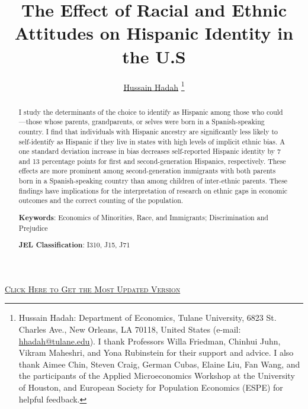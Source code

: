 \documentclass[12pt,english]{article}
\begin{document}
\title{The Effect of Racial and Ethnic Attitudes on Hispanic Identity in the U.S}

\author{\href{https://hussainhadah.com/}{Hussain Hadah} \thanks{Hussain Hadah: Department of Economics, Tulane University, 6823 St. Charles Ave., New Orleans, LA 70118, United States (e-mail: \href{mailto:hhadah@tulane.edu}{hhadah@tulane.edu}). I thank Professors Willa Friedman, Chinhui Juhn, Vikram Maheshri, and Yona Rubinstein for their support and advice. I also thank Aimee Chin, Steven Craig, German Cubas, Elaine Liu, Fan Wang, and the participants of the Applied Microeconomics Workshop at the University of Houston, and European Society for Population Economics (ESPE) for helpful feedback.}}


\maketitle

\begin{center}
\href{https://hhadah.github.io/Attitudes-and-Identity/my_paper/Hadah-Attitudes.pdf}{\textcolor{green!15!black!30!blue}{\footnotesize{\textsc{Click Here to Get the Most Updated Version}}}}
\end{center}

\begin{abstract}
I study the determinants of the choice to identify as Hispanic among those who could—those whose parents, grandparents, or selves were born in a Spanish-speaking country. I find that individuals with Hispanic ancestry are significantly less likely to self-identify as Hispanic if they live in states with high levels of implicit ethnic bias. A one standard deviation increase in bias decreases self-reported Hispanic identity by 7 and 13 percentage points for first and second-generation Hispanics, respectively. These effects are more prominent among second-generation immigrants with both parents born in a Spanish-speaking country than among children of inter-ethnic parents. These findings have implications for the interpretation of research on ethnic gaps in economic outcomes and the correct counting of the population.

\noindent\textbf{Keywords}: Economics of Minorities, Race, and Immigrants; Discrimination and Prejudice

\noindent\textbf{JEL Classification}: I310, J15, J71

\end{abstract}

\vfill
\pagebreak{}
\end{document}
